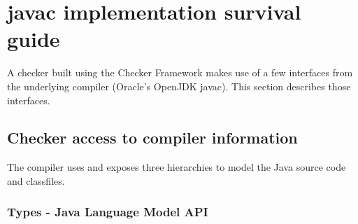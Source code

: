 %
%


\section{javac implementation survival guide\label{javac-tips}}

A checker built using the Checker Framework makes use of a few interfaces
from the underlying compiler (Oracle's OpenJDK javac).
This section describes those interfaces.




\subsection{Checker access to compiler information}

The compiler uses and exposes three hierarchies to model the Java
source code and classfiles.


\subsubsection{Types - Java Language Model API\label{javac-types}}

